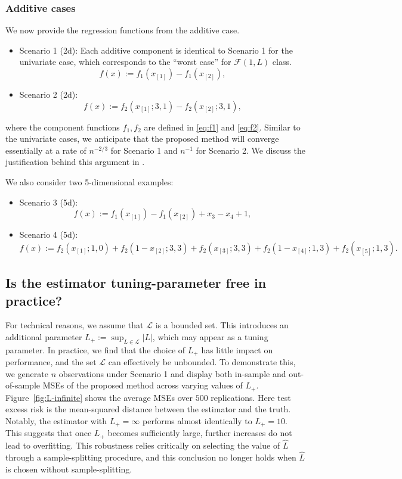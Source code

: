 \documentclass[12pt]{article}
\begin{document}
\begin{appendices}
\subsubsection{Additive cases}
We now provide the regression functions from the additive case.
\begin{itemize}
    \item Scenario 1 (2d): Each additive component is identical to Scenario 1 for the univariate case, which corresponds to the ``worst case'' for $\mathcal{F}(1,L)$ class.
    \[f(x) := f_1(x_{[1]}) - f_1(x_{[2]}),\]
    \item Scenario 2 (2d): 
    \[f(x) := f_2(x_{[1]}; 3, 1) - f_2(x_{[2]}; 3, 1),\]
\end{itemize}
where the component functions $f_1,f_2$ are defined in \eqref{eq:f1} and \eqref{eq:f2}. Similar to the univariate cases, we anticipate that the proposed method will converge essentially at a rate of $n^{-2/3}$ for Scenario 1 and $n^{-1}$ for Scenario 2. We discuss the justification behind this argument in .

We also consider two 5-dimensional examples:

\begin{itemize}
    \item Scenario 3 (5d): 
    \[f(x) := f_1(x_{[1]}) - f_1(x_{[2]}) + x_3- x_4 + 1,\]
    \item Scenario 4 (5d): 
    \[f(x) := f_2(x_{[1]}; 1, 0) + f_2(1-x_{[2]}; 3, 3) +f_2(x_{[3]}; 3, 3) + f_2(1-x_{[4]}; 1, 3) + f_2(x_{[5]}; 1, 3).\]
\end{itemize}

\subsection{Is the estimator tuning-parameter free in practice?}\label{sec:tuning-parameter-free}
For technical reasons, we assume that $\mathcal{L}$ is a bounded set. This introduces an additional parameter $L_+ := \sup_{L \in \mathcal{L}}|L|$, which may appear as a tuning parameter. In practice, we find that the choice of $L_+$ has little impact on performance, and the set $\mathcal{L}$ can effectively be unbounded. To demonstrate this, we generate $n$ observations under Scenario 1 and display both in-sample and out-of-sample MSEs of the proposed method across varying values of $L_+$. Figure~\ref{fig:L-infinite} shows the average MSEs over $500$ replications. Here test excess risk is the mean-squared distance between the estimator and the truth. Notably, the estimator with $L_+ = \infty$ performs almost identically to $L_+ = 10$. This suggests that once $L_+$ becomes sufficiently large, further increases do not lead to overfitting. This robustness relies critically on selecting the value of $\widehat{L}$ through a sample-splitting procedure, and this conclusion no longer holds when $\widehat{L}$ is chosen without sample-splitting.


\end{appendices}
\end{document}
